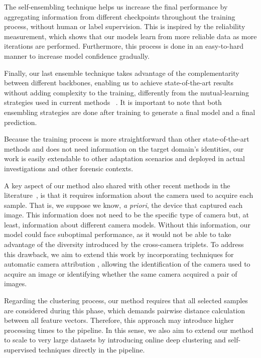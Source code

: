\documentclass[journal]{IEEEtran}
\begin{document}
The self-ensembling technique helps us increase the final performance by aggregating information from different checkpoints throughout the training process, without human or label supervision. This is inspired by the reliability measurement, which shows that our models learn from more reliable data as more iterations are performed. Furthermore, this process is done in an easy-to-hard manner to increase model confidence gradually.

Finally, our last ensemble technique takes advantage of the complementarity between different backbones, enabling us to achieve state-of-the-art results without adding complexity to the training, differently from the mutual-learning strategies used in current methods ~\cite{zhai2020multiple, yin2020sskd, chen2020enhancing}. It is important to note that both ensembling strategies are done after training to generate a final model and a final prediction.

Because the training process is more straightforward than other state-of-the-art methods and does not need information on the target domain's identities, our work is easily extendable to other adaptation scenarios and deployed in actual investigations and other forensic contexts.

A key aspect of our method also shared with other recent methods in the literature~\cite{wu2019unsupervised, zhai2020ad, zhong2020learning}, is that it requires information about the camera used to acquire each sample. That is, we suppose we know, \textit{a priori}, the device that captured each image. This information does not need to be the specific type of camera but, at least, information about different camera models. Without this information, our model could face suboptimal performance, as it would not be able to take advantage of the diversity introduced by the cross-camera triplets. To address this drawback, we aim to extend this work by incorporating techniques for automatic camera attribution \cite{costa2014open, bernacki2020survey}, allowing the identification of the camera used to acquire an image or identifying whether the same camera acquired a pair of images.

Regarding the clustering process, our method requires that all selected samples are considered during this phase, which demands pairwise distance calculation between all feature vectors. Therefore, this approach may introduce higher processing times to the pipeline. In this sense, we also aim to extend our method to scale to very large datasets by introducing online deep clustering and self-supervised techniques directly in the pipeline. 
\end{document}
